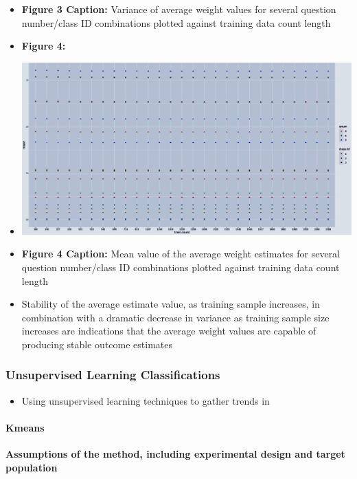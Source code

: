 \documentclass[12pt,]{article}
\providecommand{\tightlist}{%
  \setlength{\itemsep}{0pt}\setlength{\parskip}{0pt}}
\let\oldparagraph\paragraph
\renewcommand{\paragraph}[1]{\oldparagraph{#1}\mbox{}}
\begin{document}
\begin{itemize}
\item
  \textbf{ Figure 3 Caption:} Variance of average weight values for
  several question number/class ID combinations plotted against training
  data count length
\item
  \textbf{Figure 4:}
\item
  \includegraphics{mean plot.jpeg}
\item
  \textbf{Figure 4 Caption:} Mean value of the average weight estimates
  for several question number/class ID combinations plotted against
  training data count length 
\item
  Stability of the average estimate value, as training sample increases,
  in combination with a dramatic decrease in variance as training sample
  size increases are indications that the average weight values are
  capable of producing stable outcome estimates
\end{itemize}

\hypertarget{unsupervised-learning-classifications}{%
\subsubsection{Unsupervised Learning
Classifications}\label{unsupervised-learning-classifications}}

\begin{itemize}
\tightlist
\item
  Using unsupervised learning techniques to gather trends in
\end{itemize}

\hypertarget{kmeans}{%
\paragraph{Kmeans}\label{kmeans}}

\textbf{Assumptions of the method, including experimental design and target population}
\end{document}
